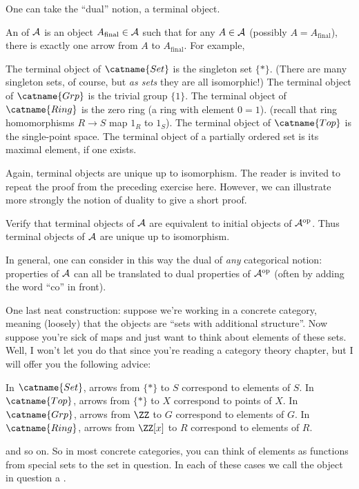 One can take the ``dual'' notion, a terminal object.
\begin{example}
	An  of $\AA$ is an object
	$A_{\text{final}} \in \AA$ such that for any $A \in \AA$ (possibly $A = A_{\text{final}}$),
	there is exactly one arrow from $A$ to $A_{\text{final}}$.
	For example,
	\begin{enumerate}[(a)]
		\ii The terminal object of $\catname{Set}$ is the singleton set $\{\ast\}$.
		(There are many singleton sets, of course, but \emph{as sets} they are all isomorphic!)
		\ii The terminal object of $\catname{Grp}$ is the trivial group $\{1\}$.
		\ii The terminal object of $\catname{Ring}$ is the zero ring (a ring with element $0=1$).
		(recall that ring homomorphisms $R \to S$ map $1_R$ to $1_S$).
		\ii The terminal object of $\catname{Top}$ is the single-point space.
		\ii The terminal object of a partially ordered set is its maximal element, if one exists.
	\end{enumerate}
\end{example}

Again, terminal objects are unique up to isomorphism.
The reader is invited to repeat the proof from the preceding exercise here.
However, we can illustrate more strongly the notion of duality to give a short proof.
\begin{ques}
	Verify that terminal objects of $\AA$ are equivalent to initial objects of $\AA^{\text{op}}$.
	Thus terminal objects of $\AA$ are unique up to isomorphism.
\end{ques}
In general, one can consider in this way the dual of \emph{any} categorical notion:
properties of $\AA$ can all be translated to dual properties of $\AA^{\text{op}}$
(often by adding the word ``co'' in front).

One last neat construction: suppose we're working in a concrete category,
meaning (loosely) that the objects are ``sets with additional structure''.
Now suppose you're sick of maps and just want to think about elements of these sets.
Well, I won't let you do that since you're reading a category theory chapter,
but I will offer you the following advice:
\begin{itemize}
	\ii In $\catname{Set}$, arrows from $\{\ast\}$ to $S$ correspond to elements of $S$.
	\ii In $\catname{Top}$, arrows from $\{\ast\}$ to $X$ correspond to points of $X$.
	\ii In $\catname{Grp}$, arrows from $\ZZ$ to $G$ correspond to elements of $G$.
	\ii In $\catname{Ring}$, arrows from $\ZZ[x]$ to $R$ correspond to elements of $R$.
\end{itemize}
and so on.
So in most concrete categories, you can think of elements as functions from special sets to the set in question.
In each of these cases we call the object in question a .

